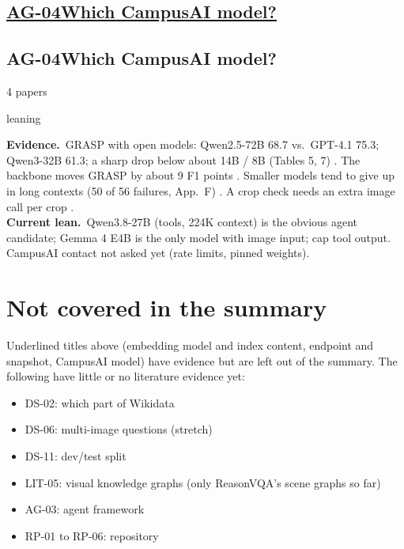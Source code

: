 \documentclass[10pt,a4paper]{article}
\newcommand{\st}[2]{\colorbox{#1}{\footnotesize\strut #2}}
\newcommand{\leaning}{\st{yellow!35}{leaning}}
\newcommand{\qblock}[1][]{\def\qkey{#1}\qblockx}
\newcommand{\qblockx}[4]{%
  \ifx\qkey\empty
  \subsection*{\underline{#1\quad #2}}%
  \else\hypertarget{\qkey}{}
  \subsection*{#1\quad #2}\fi%
{\footnotesize #3 papers\quad}#4\par}
\newcommand{\ev}{\textbf{Evidence.}}
\newcommand{\lean}{\textbf{Current lean.}}
\begin{document}
\qblock{AG-04}{Which CampusAI model?}{4}{\leaning}
\ev\ GRASP with open models: Qwen2.5-72B 68.7 vs.\ GPT-4.1 75.3; Qwen3-32B
61.3; a sharp drop below about 14B / 8B (Tables 5, 7) \cite{walter2025grasp}.
The backbone moves GRASP by about 9 F1 points \cite{walter2026grasp}. Smaller
models tend to give up in long contexts (50 of 56 failures, App.~F)
\cite{wisam2026kgvoyager}. A crop check needs an extra image call per crop
\cite{shen2026sage}.\\
\lean\ Qwen3.8-27B (tools, 224K context) is the obvious agent candidate;
Gemma 4 E4B is the only model with image input; cap tool output.
CampusAI contact not asked yet (rate limits,
pinned weights).

\section*{Not covered in the summary}
Underlined titles above (embedding model and index content, endpoint and
snapshot, CampusAI model) have evidence but are left out of the summary. The
following have little or no literature evidence yet:
\begin{itemize}
  \item DS-02: which part of Wikidata
  \item DS-06: multi-image questions (stretch)
  \item DS-11: dev/test split
  \item LIT-05: visual knowledge graphs (only ReasonVQA's scene graphs so far)
  \item AG-03: agent framework
  \item RP-01 to RP-06: repository
\end{itemize}

\printbibliography
\end{document}

